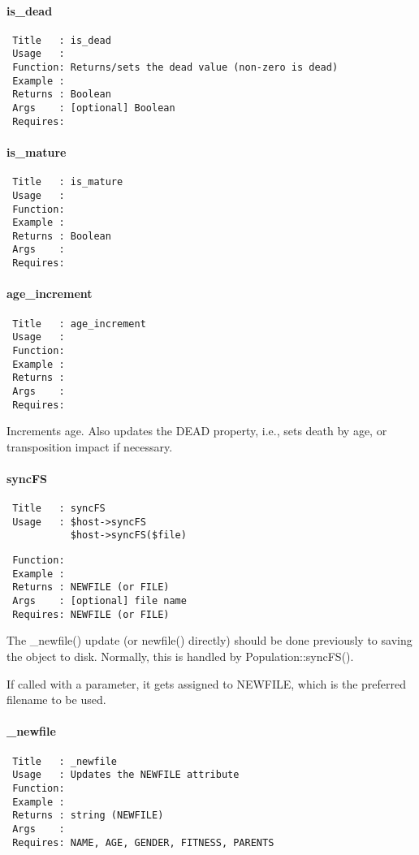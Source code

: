 \paragraph*{is\_dead\label{is_dead}}
\begin{verbatim}
 Title   : is_dead
 Usage   :
 Function: Returns/sets the dead value (non-zero is dead)
 Example :
 Returns : Boolean
 Args    : [optional] Boolean
 Requires:
\end{verbatim}
\paragraph*{is\_mature\label{is_mature}}
\begin{verbatim}
 Title   : is_mature
 Usage   :
 Function: 
 Example :
 Returns : Boolean
 Args    :
 Requires:
\end{verbatim}
\paragraph*{age\_increment\label{age_increment}}
\begin{verbatim}
 Title   : age_increment
 Usage   :
 Function: 
 Example :
 Returns :
 Args    :
 Requires:
\end{verbatim}


Increments age. Also updates the DEAD property, i.e., sets death by age, or transposition impact if necessary.

\paragraph*{syncFS\label{syncFS}}
\begin{verbatim}
 Title   : syncFS
 Usage   : $host->syncFS
           $host->syncFS($file)
\end{verbatim}
\begin{verbatim}
 Function: 
 Example : 
 Returns : NEWFILE (or FILE)
 Args    : [optional] file name
 Requires: NEWFILE (or FILE)
\end{verbatim}


The \_newfile() update (or newfile() directly) should be done
previously to saving the object to disk. Normally, this is handled by
Population::syncFS().



If called with a parameter, it gets assigned to NEWFILE, which is the
preferred filename to be used.

\paragraph*{\_newfile\label{_newfile}}
\begin{verbatim}
 Title   : _newfile
 Usage   : Updates the NEWFILE attribute
 Function: 
 Example : 
 Returns : string (NEWFILE)
 Args    : 
 Requires: NAME, AGE, GENDER, FITNESS, PARENTS
\end{verbatim}


